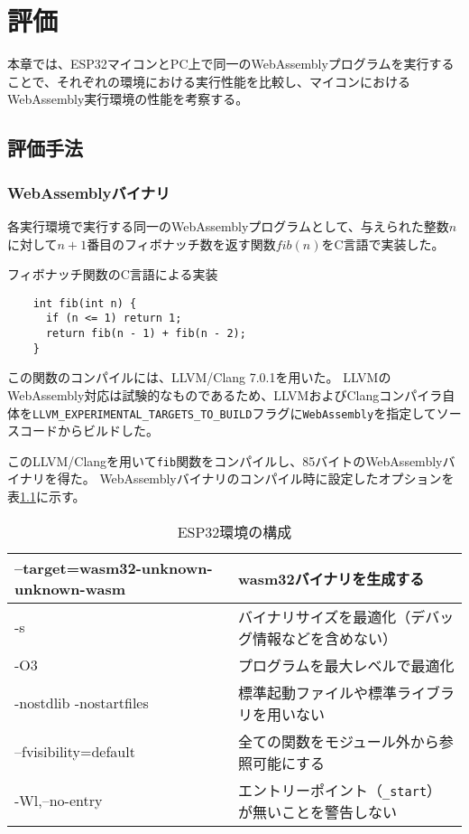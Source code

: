 \chapter{評価}
\label{chap:evaluation}

本章では、ESP32マイコンとPC上で同一のWebAssemblyプログラムを実行することで、それぞれの環境における実行性能を比較し、マイコンにおけるWebAssembly実行環境の性能を考察する。

\section{評価手法}

\subsection{WebAssemblyバイナリ}
\label{subsec:wasm}

各実行環境で実行する同一のWebAssemblyプログラムとして、与えられた整数$n$に対して$n+1$番目のフィボナッチ数を返す関数$fib(n)$をC言語で実装した。

\begin{itembox}[l]{フィボナッチ関数のC言語による実装}
  \begin{verbatim}
    int fib(int n) {
      if (n <= 1) return 1;
      return fib(n - 1) + fib(n - 2);
    }
  \end{verbatim}
\end{itembox}

この関数のコンパイルには、LLVM/Clang 7.0.1を用いた。
LLVMのWebAssembly対応は試験的なものであるため、LLVMおよびClangコンパイラ自体を{\tt LLVM\_EXPERIMENTAL\_TARGETS\_TO\_BUILD}フラグに{\tt WebAssembly}を指定してソースコードからビルドした。

このLLVM/Clangを用いて{\tt fib}関数をコンパイルし、85バイトのWebAssemblyバイナリを得た。
WebAssemblyバイナリのコンパイル時に設定したオプションを表\ref{tab:compiler}に示す。

\begin{table}[htbp]
  \label{tab:compiler}
  \caption{ESP32環境の構成}
  \begin{center}
    \begin{tabular}{|l|l|}
    \hline
    --target=wasm32-unknown-unknown-wasm & wasm32バイナリを生成する \\ \hline
    -s & バイナリサイズを最適化（デバッグ情報などを含めない） \\ \hline
    -O3 & プログラムを最大レベルで最適化 \\ \hline
    -nostdlib -nostartfiles & 標準起動ファイルや標準ライブラリを用いない \\ \hline
    --fvisibility=default & 全ての関数をモジュール外から参照可能にする \\ \hline
    -Wl,--no-entry & エントリーポイント（{\tt \_start}）が無いことを警告しない \\ \hline
    \end{tabular}
  \end{center}
\end{table}

